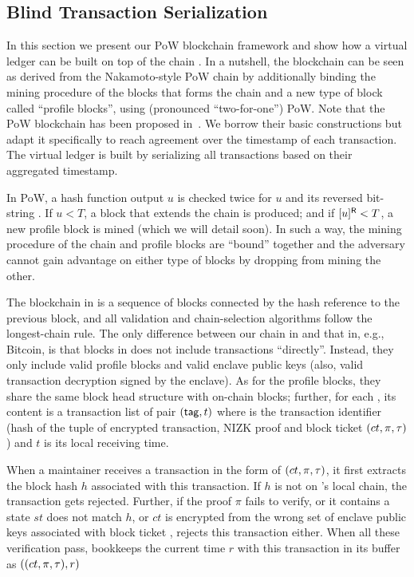 \subsection{Blind Transaction Serialization}
\label{subsec:blind-transaction-serialization}

In this section we present our PoW blockchain framework and show how a virtual ledger \ledger can be built on top of the chain \chain.
%
In a nutshell, the blockchain \chain can be seen as derived from the Nakamoto-style PoW chain by additionally binding the mining procedure of the blocks that forms the chain \chain and a new type of block called ``profile blocks'', using \twoforone (pronounced ``two-for-one'') PoW.
%
Note that the \twoforone PoW blockchain has been proposed in~\cite{EC:GarKiaLeo15}.
%
We borrow their basic constructions but adapt it specifically to reach agreement over the timestamp of each transaction.
%
The virtual ledger \ledger is built by serializing all transactions based on their aggregated timestamp.

In \twoforone PoW, a hash function output $u$ is checked twice for $u$ and its reversed bit-string .
%
If $u< T$, a block that extends the chain \chain is produced; and if $[u]^{\mathsf{R}} < T$, a new profile block \PB is mined (which we will detail soon).
%
In such a way, the mining procedure of the chain \chain and profile blocks are ``bound'' together and the adversary cannot gain advantage on either type of blocks by dropping from mining the other.

The blockchain \chain in \protocFairLedger is a sequence of blocks connected by the hash reference to the previous block, and all validation and chain-selection algorithms follow the longest-chain rule.
%
The only difference between our chain \chain in \protocFairLedger and that in, e.g.,  Bitcoin, is that blocks in \chain does not include transactions ``directly''.
%
Instead, they only include valid profile blocks and valid enclave public keys (also, valid transaction decryption signed by the enclave).
%
As for the profile blocks, they share the same block head structure with on-chain blocks; further, for each \PB, its content is a transaction list of pair $(\mathsf{tag}, t)$ where \txTag is the transaction identifier (hash of the tuple of encrypted transaction, NIZK proof and block ticket $(ct, \pi, \mathsf{\tau})$) and $t$ is its local receiving time.

When a maintainer \party receives a transaction in the form of $(ct, \pi, \mathsf{\tau})$, it first extracts the block hash $h$ associated with this transaction.
%
If $h$ is not on \party's local chain, the transaction gets rejected.
%
Further, if the proof $\pi$ fails to verify, or it contains a state $st$ does not match $h$, or $ct$ is encrypted from the wrong set of enclave public keys associated with block ticket \ticket, \party rejects this transaction either.
%
When all these verification pass, \party bookkeeps the current time $r$ with this transaction in its buffer as $((ct, \pi, \mathsf{\tau}), r)$

